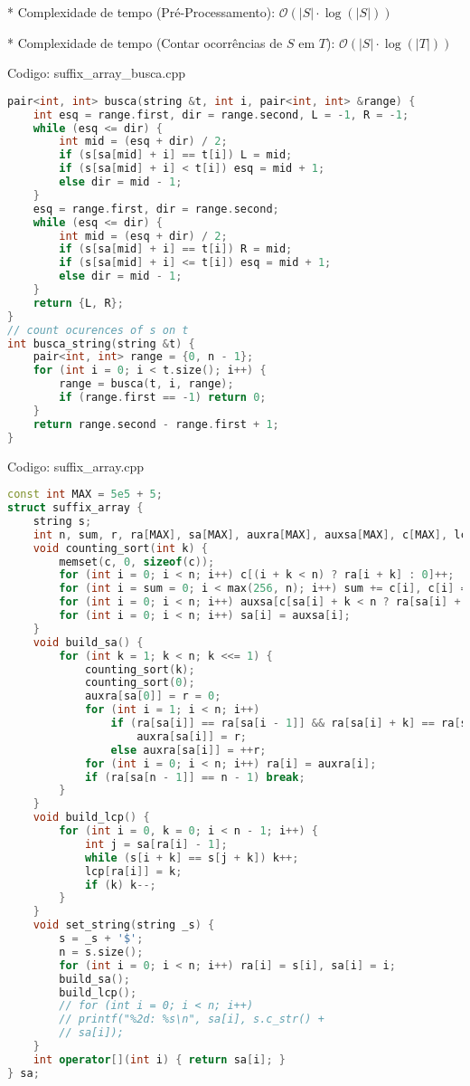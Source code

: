 \documentclass[10pt, a4paper, oneside]{book}
\begin{document}
* Complexidade de tempo (Pré-Processamento): $\mathcal{O}(|S| \cdot \log(|S|))$

* Complexidade de tempo (Contar ocorrências de \(S\) em \(T\)): $\mathcal{O}(|S| \cdot \log(|T|))$

\hfill

Codigo: suffix\_array\_busca.cpp

\begin{lstlisting}[language=C++]
pair<int, int> busca(string &t, int i, pair<int, int> &range) {
    int esq = range.first, dir = range.second, L = -1, R = -1;
    while (esq <= dir) {
        int mid = (esq + dir) / 2;
        if (s[sa[mid] + i] == t[i]) L = mid;
        if (s[sa[mid] + i] < t[i]) esq = mid + 1;
        else dir = mid - 1;
    }
    esq = range.first, dir = range.second;
    while (esq <= dir) {
        int mid = (esq + dir) / 2;
        if (s[sa[mid] + i] == t[i]) R = mid;
        if (s[sa[mid] + i] <= t[i]) esq = mid + 1;
        else dir = mid - 1;
    }
    return {L, R};
}
// count ocurences of s on t
int busca_string(string &t) {
    pair<int, int> range = {0, n - 1};
    for (int i = 0; i < t.size(); i++) {
        range = busca(t, i, range);
        if (range.first == -1) return 0;
    }
    return range.second - range.first + 1;
}\end{lstlisting}
\hfill

Codigo: suffix\_array.cpp

\begin{lstlisting}[language=C++]
const int MAX = 5e5 + 5;
struct suffix_array {
    string s;
    int n, sum, r, ra[MAX], sa[MAX], auxra[MAX], auxsa[MAX], c[MAX], lcp[MAX];
    void counting_sort(int k) {
        memset(c, 0, sizeof(c));
        for (int i = 0; i < n; i++) c[(i + k < n) ? ra[i + k] : 0]++;
        for (int i = sum = 0; i < max(256, n); i++) sum += c[i], c[i] = sum - c[i];
        for (int i = 0; i < n; i++) auxsa[c[sa[i] + k < n ? ra[sa[i] + k] : 0]++] = sa[i];
        for (int i = 0; i < n; i++) sa[i] = auxsa[i];
    }
    void build_sa() {
        for (int k = 1; k < n; k <<= 1) {
            counting_sort(k);
            counting_sort(0);
            auxra[sa[0]] = r = 0;
            for (int i = 1; i < n; i++)
                if (ra[sa[i]] == ra[sa[i - 1]] && ra[sa[i] + k] == ra[sa[i - 1] + k])
                    auxra[sa[i]] = r;
                else auxra[sa[i]] = ++r;
            for (int i = 0; i < n; i++) ra[i] = auxra[i];
            if (ra[sa[n - 1]] == n - 1) break;
        }
    }
    void build_lcp() {
        for (int i = 0, k = 0; i < n - 1; i++) {
            int j = sa[ra[i] - 1];
            while (s[i + k] == s[j + k]) k++;
            lcp[ra[i]] = k;
            if (k) k--;
        }
    }
    void set_string(string _s) {
        s = _s + '$';
        n = s.size();
        for (int i = 0; i < n; i++) ra[i] = s[i], sa[i] = i;
        build_sa();
        build_lcp();
        // for (int i = 0; i < n; i++)
        // printf("%2d: %s\n", sa[i], s.c_str() +
        // sa[i]);
    }
    int operator[](int i) { return sa[i]; }
} sa;
\end{lstlisting}
\hfill
\end{document}
